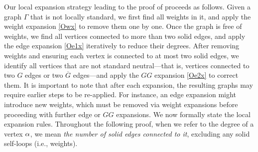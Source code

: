 Our local expansion strategy leading to the proof of  proceeds as follows. Given a graph $\Gamma$ that is not locally standard, we first find all weights in it, and apply the weight expansion \eqref{Owx} to remove them one by one. 
Once the graph is free of weights, we find all vertices connected to more than two solid edges, and apply the edge expansion \eqref{Oe1x} iteratively to reduce their degrees.  
After removing weights and ensuring each vertex is connected to at most two solid edges, we identify all vertices that are not standard neutral---that is, vertices connected to two $G$ edges or two $\overline G$ edges---and apply the $GG$ expansion \eqref{Oe2x} to correct them.
It is important to note that after each expansion, the resulting graphs may require earlier steps to be re-applied. For instance, an edge expansion might introduce new weights, which must be removed via weight expansions before proceeding with further edge or $GG$ expansions. %
We now formally state the local expansion rules. Throughout the following proof, when we refer to the degree of a vertex $\alpha$, we mean \emph{the number of solid edges connected to it}, excluding any solid self-loops (i.e., weights).





